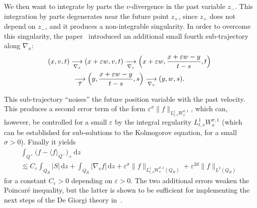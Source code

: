 \documentclass[10pt,a4paper]{amsart}
\theoremstyle{definition}
\newcommand{\cT}{{\mathcal T}}
\newcommand{\dd}{{\, \mathrm d}}
\let\var\varepsilon
\begin{document}
We then want to integrate by parts the $v$-divergence in the
past variable $z_-$. This integration by parts degenerates near
the future point $z_+$, since $z_+$ does not depend on $z_-$, and
it produces a non-integrable singularity. In order to overcome
this singularity, the paper~\cite{guerand-mouhot} introduced an
additional small fourth sub-trajectory along $\nabla_x$:
\begin{multline*}
(x,v,t)
\underset{\nabla_x}{\longrightarrow}
(x+\varepsilon w,v,t) \underset{\nabla_v}{\longrightarrow}
\Bigl(x+\varepsilon w, \frac{x+\varepsilon w
-y}{t-s},t \Bigr) \\
\underset{\cT}{\longrightarrow} \Bigl(y,\frac{x+\varepsilon w
-y}{t-s},s\Bigr) \underset{\nabla_v}{\longrightarrow}
(y,w,s).
\end{multline*}

This sub-trajectory ``noises'' the future position variable with
the past velocity. This produces a second error term of the form
$\var^\sigma \| f \|_{L^1_{t,v} W^{\sigma,1}_x}$, which can, however,
be controlled for a small $\var$ by the
integral regularity $L^1_{t,v} W^{\sigma,1}_{x}$ (which can be
established for sub-solutions to the Kolmogorov equation, for a
small $\sigma>0$). Finally it
yields
\begin{multline*}
\int_{Q^+} \big(f - \langle
f\rangle_{Q^-}\big)_+ \dd z\\
\lesssim
C_\var \int_{Q_R} \big\vert S\big\vert \dd z +
\int_{Q_R} \big\vert \nabla_v f\big\vert \dd z + \var^\sigma \| f
\|_{L^1_{t,v} W^{\sigma,1}_x(Q_R)} + \var^{2d} \|f\|_{L^2(Q_R)}
\end{multline*}
for a constant $C_\var >0$ depending on $\var>0$. The two
additional errors weaken the Poincaré inequality, but the latter
is shown to be sufficient for implementing the next steps of the
De Giorgi theory in~\cite{guerand-mouhot}.
\end{document}

